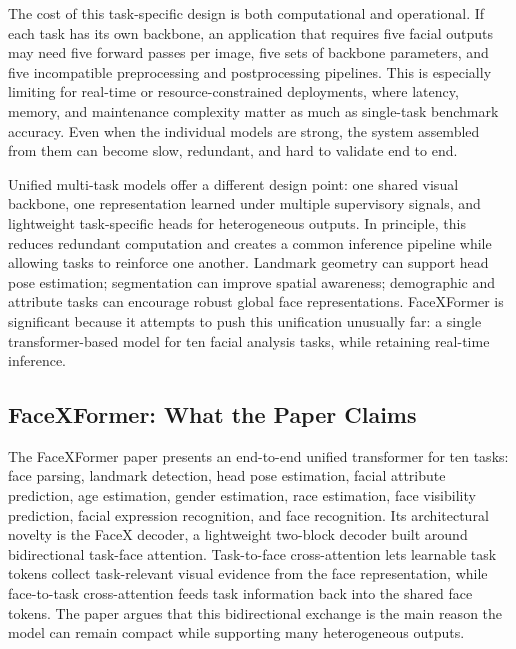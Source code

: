 \documentclass[11pt]{article}
\begin{document}
The cost of this task-specific design is both computational and operational. If each task has its own backbone, an application that requires five facial outputs may need five forward passes per image, five sets of backbone parameters, and five incompatible preprocessing and postprocessing pipelines. This is especially limiting for real-time or resource-constrained deployments, where latency, memory, and maintenance complexity matter as much as single-task benchmark accuracy. Even when the individual models are strong, the system assembled from them can become slow, redundant, and hard to validate end to end.


Unified multi-task models offer a different design point: one shared visual backbone, one representation learned under multiple supervisory signals, and lightweight task-specific heads for heterogeneous outputs. In principle, this reduces redundant computation and creates a common inference pipeline while allowing tasks to reinforce one another. Landmark geometry can support head pose estimation; segmentation can improve spatial awareness; demographic and attribute tasks can encourage robust global face representations. FaceXFormer is significant because it attempts to push this unification unusually far: a single transformer-based model for ten facial analysis tasks, while retaining real-time inference.


\subsection{FaceXFormer: What the Paper Claims}


The FaceXFormer paper presents an end-to-end unified transformer for ten tasks: face parsing, landmark detection, head pose estimation, facial attribute prediction, age estimation, gender estimation, race estimation, face visibility prediction, facial expression recognition, and face recognition. Its architectural novelty is the FaceX decoder, a lightweight two-block decoder built around bidirectional task-face attention. Task-to-face cross-attention lets learnable task tokens collect task-relevant visual evidence from the face representation, while face-to-task cross-attention feeds task information back into the shared face tokens. The paper argues that this bidirectional exchange is the main reason the model can remain compact while supporting many heterogeneous outputs.
\end{document}
